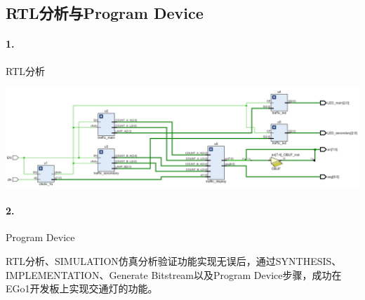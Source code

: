 \documentclass[a4,10pt,zihao=-4]{ctexart}
\begin{document}
\newpage


\subsection{RTL分析与Program Device}

\paragraph{1.} RTL分析

\vspace{1em}

\noindent\includegraphics[width=1\textwidth]{schematic.png}


\paragraph{2.} Program Device

RTL分析、SIMULATION仿真分析验证功能实现无误后，通过SYNTHESIS、IMPLEMENTATION、Generate Bitstream以及Program Device步骤，成功在EGo1开发板上实现交通灯的功能。

\vspace{1em}
\end{document}

